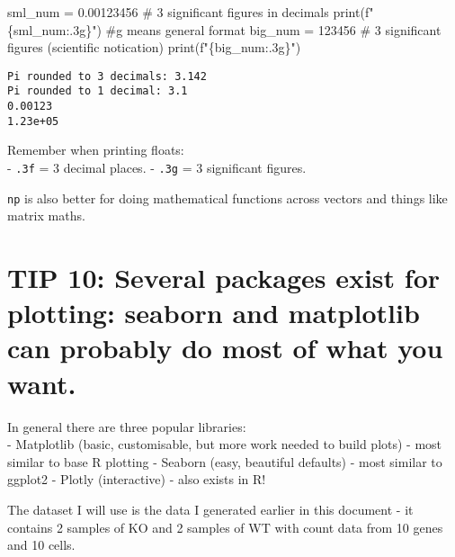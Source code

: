 \documentclass[
  letterpaper,
  DIV=11,
  numbers=noendperiod]{scrartcl}
\newenvironment{Shaded}{\begin{snugshade}}{\end{snugshade}}
\newcommand{\BuiltInTok}[1]{\textcolor[rgb]{0.00,0.23,0.31}{#1}}
\newcommand{\CommentTok}[1]{\textcolor[rgb]{0.37,0.37,0.37}{#1}}
\newcommand{\DecValTok}[1]{\textcolor[rgb]{0.68,0.00,0.00}{#1}}
\newcommand{\FloatTok}[1]{\textcolor[rgb]{0.68,0.00,0.00}{#1}}
\newcommand{\NormalTok}[1]{\textcolor[rgb]{0.00,0.23,0.31}{#1}}
\newcommand{\OperatorTok}[1]{\textcolor[rgb]{0.37,0.37,0.37}{#1}}
\newcommand{\SpecialCharTok}[1]{\textcolor[rgb]{0.37,0.37,0.37}{#1}}
\newcommand{\SpecialStringTok}[1]{\textcolor[rgb]{0.13,0.47,0.30}{#1}}
\begin{document}
\begin{Shaded}
\begin{Highlighting}[]
\NormalTok{sml\_num }\OperatorTok{=} \FloatTok{0.00123456}
\CommentTok{\# 3 significant figures in decimals}
\BuiltInTok{print}\NormalTok{(}\SpecialStringTok{f"}\SpecialCharTok{\{}\NormalTok{sml\_num}\SpecialCharTok{:.3g\}}\SpecialStringTok{"}\NormalTok{) }\CommentTok{\#g means general format}
\NormalTok{big\_num }\OperatorTok{=} \DecValTok{123456}
\CommentTok{\# 3 significant figures (scientific notication)}
\BuiltInTok{print}\NormalTok{(}\SpecialStringTok{f"}\SpecialCharTok{\{}\NormalTok{big\_num}\SpecialCharTok{:.3g\}}\SpecialStringTok{"}\NormalTok{)}
\end{Highlighting}
\end{Shaded}

\begin{verbatim}
Pi rounded to 3 decimals: 3.142
Pi rounded to 1 decimal: 3.1
0.00123
1.23e+05
\end{verbatim}

Remember when printing floats:\\
- \texttt{.3f} = 3 decimal places. - \texttt{.3g} = 3 significant
figures.

\texttt{np} is also better for doing mathematical functions across
vectors and things like matrix maths.

\section{TIP 10: Several packages exist for plotting: seaborn and
matplotlib can probably do most of what you
want.}\label{tip-10-several-packages-exist-for-plotting-seaborn-and-matplotlib-can-probably-do-most-of-what-you-want.}

In general there are three popular libraries:\\
- Matplotlib (basic, customisable, but more work needed to build plots)
- most similar to base R plotting - Seaborn (easy, beautiful defaults) -
most similar to ggplot2 - Plotly (interactive) - also exists in R!

The dataset I will use is the data I generated earlier in this document
- it contains 2 samples of KO and 2 samples of WT with count data from
10 genes and 10 cells.
\end{document}
